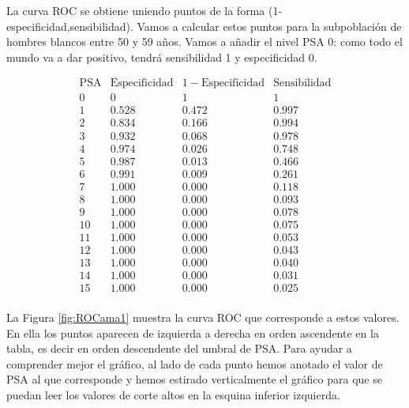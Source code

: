 \documentclass[
]{book}
\theoremstyle{definition}
\theoremstyle{definition}
\theoremstyle{definition}
\theoremstyle{definition}
\theoremstyle{remark}
\begin{document}
La curva ROC se obtiene uniendo puntos de la forma (1-especificidad,sensibilidad). Vamos a calcular estos puntos para la subpoblación de hombres blancos entre 50 y 59 años. Vamos a añadir el nivel PSA 0: como todo el mundo va a dar positivo, tendrá sensibilidad 1 y especificidad 0.

\[
\begin{array}{c|ccc}
\text{PSA} & \text{Especificidad}& 1-\text{Especificidad}& \text{Sensibilidad}\\ \hline
0 & 0 & 1 & 1 \\
1 & 0.528 & 0.472 & 0.997 \\
2 &  0.834 & 0.166 &0.994\\
3 & 0.932 & 0.068 &0.978\\
4 & 0.974 & 0.026 &0.748\\
5 & 0.987 & 0.013 &0.466\\
6 & 0.991 & 0.009 &0.261\\
7 & 1.000 & 0.000 &0.118\\
8 & 1.000  &0.000 &0.093\\
9 & 1.000  &0.000 &0.078\\
10 & 1.000 & 0.000 &0.075\\
11 & 1.000 & 0.000 &0.053\\
12 & 1.000 & 0.000 & 0.043\\
13 & 1.000 & 0.000 &0.040\\
14 & 1.000  &0.000 & 0.031\\
15 & 1.000  &0.000 & 0.025\\
\end{array}
\]

La Figura \ref{fig:ROCama1} muestra la curva ROC que corresponde a estos valores. En ella los puntos aparecen de izquierda a derecha en orden ascendente en la tabla, es decir en orden descendente del umbral de PSA. Para ayudar a comprender mejor el gráfico, al lado de cada punto hemos anotado el valor de PSA al que corresponde y hemos estirado verticalmente el gráfico para que se puedan leer los valores de corte altos en la esquina inferior izquierda.
\end{document}
